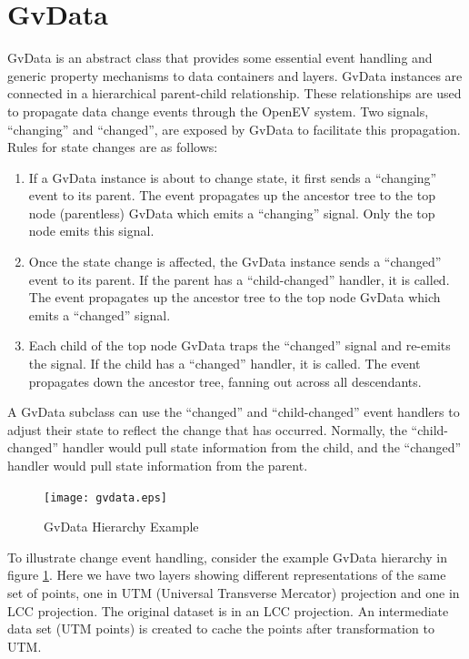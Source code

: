\documentclass{openevreport}
\begin{document}
\section{GvData}

GvData is an abstract class that provides some essential event
handling and generic property 
mechanisms to data containers and layers.  GvData instances
are connected in a hierarchical parent-child relationship.  These
relationships are used to propagate data change events through the
OpenEV system.  Two signals, ``changing'' and ``changed'', are exposed
by GvData to facilitate this propagation.  Rules for state changes are 
as follows:

\begin{enumerate}
\item If a GvData instance is about to change state, it first sends a
``changing'' event to its parent.  The event propagates up the
ancestor tree to the top node (parentless) GvData which emits a
``changing'' signal.  Only the top node emits this signal.
\item Once the state change is affected, the GvData instance sends a
``changed'' event to its parent.  If the parent has a
``child-changed'' handler, it is called.  The event propagates up the
ancestor tree to the top node GvData which emits a ``changed''
signal.
\item Each child of the top node GvData traps the ``changed'' signal
and re-emits the signal.  If the child has a ``changed'' handler, it
is called.  The event propagates down the ancestor tree, fanning out
across all descendants.
\end{enumerate}

A GvData subclass can use the ``changed'' and ``child-changed'' event
handlers to adjust their state to reflect the change that has
occurred.  Normally, the ``child-changed'' handler would pull state
information from the child, and the ``changed'' handler would pull
state information from the parent.

\begin{figure}
\centering
\texttt{[image: gvdata.eps]}
\caption{GvData Hierarchy Example}
\label{fig:gvdata}
\end{figure}

To illustrate change event handling, consider the example GvData
hierarchy in figure \ref{fig:gvdata}.  Here we have two layers showing 
different representations of the same set of points, one in UTM (Universal Transverse Mercator)
projection and one in LCC projection.  The original dataset is in an
LCC projection.  An intermediate data set (UTM points) is created to
cache the points after transformation to UTM.
\end{document}
